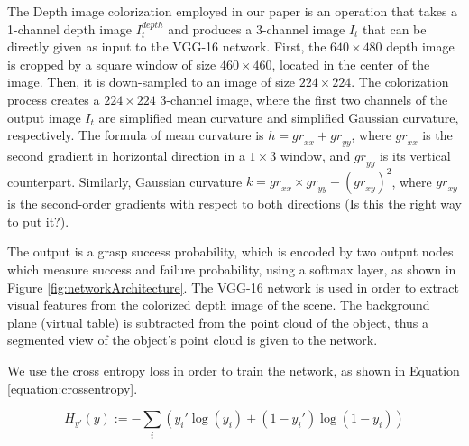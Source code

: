 The Depth image colorization employed in our paper is an operation that takes a 1-channel depth image $I_{t}^{depth}$ and produces a 3-channel image $I_t$ that can be directly given as input to the VGG-16 network. First, the $640 \times 480$ depth image is cropped by a square window of size $460 \times 460$, located in the center of the image. Then, it is down-sampled to an image of size $224 \times 224$. The colorization process creates a $224 \times 224$ 3-channel image, where the first two channels of the output image $I_t$ are simplified mean curvature and simplified Gaussian curvature, respectively. The formula of mean curvature is $h = {gr}_{xx} + {gr}_{yy}$, where ${gr}_{xx}$ is the second gradient in horizontal direction in a $1 \times 3$ window, and ${gr}_{yy}$ is its vertical counterpart. Similarly, Gaussian curvature $k = {gr}_{xx} \times {gr}_{yy} - ({gr}_{xy})^2$, where ${gr}_{xy}$ is the second-order gradients with respect to both directions (Is this the right way to put it?).

The output is a grasp success probability, which is encoded by two output nodes which measure success and failure probability, using a softmax layer, as shown in Figure \ref{fig:networkArchitecture}. The VGG-16 network is used in order to extract visual features from the colorized depth image of the scene. The background plane (virtual table) is subtracted from the point cloud of the object, thus a segmented view of the object's point cloud is given to the network. 

We use the cross entropy loss in order to train the network, as shown in Equation \ref{equation:crossentropy}.

\begin{equation}
H_{y'}(y) := - \sum_{i} ({y_i' \log(y_i) + (1-y_i') \log (1-y_i)})
\label{equation:crossentropy}
\end{equation}

